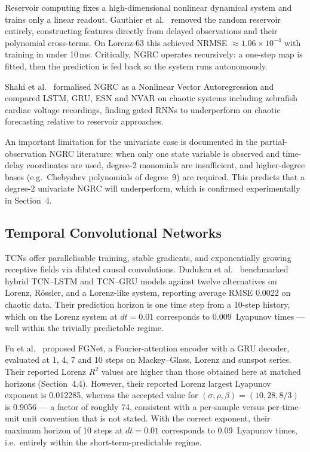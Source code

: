 \documentclass[11pt,a4paper]{article}
\begin{document}
Reservoir computing fixes a high-dimensional nonlinear dynamical system and trains only a linear readout.
Gauthier et al.~\cite{gauthier2021} removed the random reservoir entirely, constructing features directly from delayed observations and their polynomial cross-terms.
On Lorenz-63 this achieved NRMSE $\approx 1.06 \times 10^{-4}$ with training in under 10\,ms.
Critically, NGRC operates recursively: a one-step map is fitted, then the prediction is fed back so the system runs autonomously.

Shahi et al.~\cite{shahi2022} formalised NGRC as a Nonlinear Vector Autoregression and compared LSTM, GRU, ESN and NVAR on chaotic systems including zebrafish cardiac voltage recordings, finding gated RNNs to underperform on chaotic forecasting relative to reservoir approaches.

An important limitation for the univariate case is documented in the partial-observation NGRC literature: when only one state variable is observed and time-delay coordinates are used, degree-2 monomials are insufficient, and higher-degree bases (e.g.\ Chebyshev polynomials of degree~9) are required.
This predicts that a degree-2 univariate NGRC will underperform, which is confirmed experimentally in Section~4.

\subsection{Temporal Convolutional Networks}

TCNs offer parallelisable training, stable gradients, and exponentially growing receptive fields via dilated causal convolutions.
Dudukcu et al.~\cite{dudukcu2023} benchmarked hybrid TCN--LSTM and TCN--GRU models against twelve alternatives on Lorenz, R\"ossler, and a Lorenz-like system, reporting average RMSE 0.0022 on chaotic data.
Their prediction horizon is one time step from a 10-step history, which on the Lorenz system at $dt = 0.01$ corresponds to 0.009~Lyapunov times --- well within the trivially predictable regime.

Fu et al.~\cite{fu2024} proposed FGNet, a Fourier-attention encoder with a GRU decoder, evaluated at 1, 4, 7 and 10 steps on Mackey--Glass, Lorenz and sunspot series.
Their reported Lorenz $R^2$ values are higher than those obtained here at matched horizons (Section~4.4).
However, their reported Lorenz largest Lyapunov exponent is 0.012285, whereas the accepted value for $(\sigma, \rho, \beta) = (10, 28, 8/3)$ is 0.9056 --- a factor of roughly 74, consistent with a per-sample versus per-time-unit unit convention that is not stated.
With the correct exponent, their maximum horizon of 10 steps at $dt = 0.01$ corresponds to 0.09~Lyapunov times, i.e.\ entirely within the short-term-predictable regime.
\end{document}
